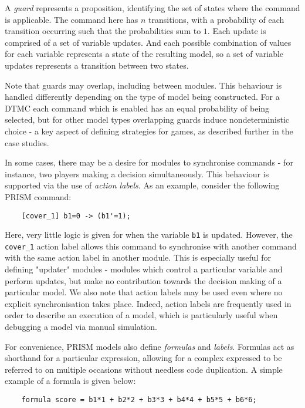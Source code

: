 A \emph{guard} represents a proposition, identifying the set of states where the command is applicable. The command here has $n$ transitions, with a probability of each transition occurring such that the probabilities sum to $1$. Each update is comprised of a set of variable updates. And each possible combination of values for each variable represents a state of the resulting model, so a set of variable updates represents a transition between two states.

Note that guards may overlap, including between modules. This behaviour is handled differently depending on the type of model being constructed. For a DTMC each command which is enabled has an equal probability of being selected, but for other model types overlapping guards induce nondeterministic choice - a key aspect of defining strategies for games, as described further in the case studies.

In some cases, there may be a desire for modules to synchronise commands - for instance, two players making a decision simultaneously. This behaviour is supported via the use of \emph{action labels}. As an example, consider the following PRISM command:

\begin{verbatim}
    [cover_1] b1=0 -> (b1'=1);
\end{verbatim}

Here, very little logic is given for when the variable \verb+b1+ is updated. However, the \verb+cover_1+ action label allows this command to synchronise with another command with the same action label in another module. This is especially useful for defining "updater" modules - modules which control a particular variable and perform updates, but make no contribution towards the decision making of a particular model. We also note that action labels may be used even where no explicit synchronisation takes place. Indeed, action labels are frequently used in order to describe an execution of a model, which is particularly useful when debugging a model via manual simulation.

For convenience, PRISM models also define \emph{formulas} and \emph{labels}. Formulas act as shorthand for a particular expression, allowing for a complex expressed to be referred to on multiple occasions without needless code duplication. A simple example of a formula is given below:

\begin{verbatim}
    formula score = b1*1 + b2*2 + b3*3 + b4*4 + b5*5 + b6*6;
\end{verbatim}

